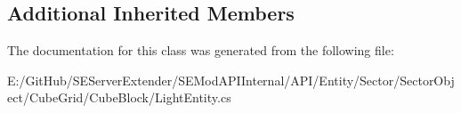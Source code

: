 \subsection*{Additional Inherited Members}


The documentation for this class was generated from the following file\+:\begin{DoxyCompactItemize}
\item 
E\+:/\+Git\+Hub/\+S\+E\+Server\+Extender/\+S\+E\+Mod\+A\+P\+I\+Internal/\+A\+P\+I/\+Entity/\+Sector/\+Sector\+Object/\+Cube\+Grid/\+Cube\+Block/Light\+Entity.\+cs\end{DoxyCompactItemize}
